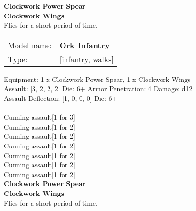 {\bf Clockwork Power Spear } \\






{\bf Clockwork Wings } \\

Flies for a short period of time.\\ 





 



\begin{tabular}{ll}
Model name: & {\bf Ork Infantry } \\
Type: & [infantry, walks] \\
\end{tabular}

Equipment: 1 x Clockwork Power Spear, 1 x Clockwork Wings \\

Assault: [3, 2, 2, 2] Die: 6+ Armor Penetration: 4 Damage: d12 \\
Assault Deflection: [1, 0, 0, 0] Die: 6+\\
\\ 
Cunning assault[1 for 3]\\ 
Cunning assault[1 for 2]\\ 
Cunning assault[1 for 2]\\ 
Cunning assault[1 for 2]\\ 
Cunning assault[1 for 2]\\ 
Cunning assault[1 for 2]\\ 
Cunning assault[1 for 2]\\ 
 



{\bf Clockwork Power Spear } \\






{\bf Clockwork Wings } \\

Flies for a short period of time.\\ 





 















